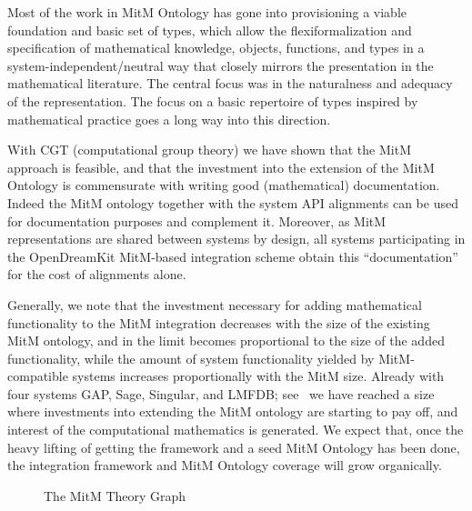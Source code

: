 \documentclass{deliverablereport}
\begin{document}
Most of the work in MitM Ontology has gone into provisioning a viable foundation
and basic set of types, which allow the flexiformalization and specification of
mathematical knowledge, objects, functions, and types in a system-independent/neutral way
that closely mirrors the presentation in the mathematical literature. The central focus
was in the naturalness and adequacy of the representation. The focus on a basic repertoire
of types inspired by mathematical practice goes a long way into this direction.

With CGT (computational group theory) we have shown that the MitM approach is feasible,
and that the investment into the extension of the MitM Ontology is commensurate with
writing good (mathematical) documentation. Indeed the MitM ontology together with the
system API alignments can be used for documentation purposes and complement it. Moreover, as
MitM representations are shared between systems by design, all systems participating in
the OpenDreamKit MitM-based integration scheme obtain this ``documentation'' for the cost
of alignments alone. 

Generally, we note that the investment necessary for adding mathematical functionality to
the MitM integration decreases with the size of the existing MitM ontology, and in the
limit becomes proportional to the size of the added functionality, while the amount of
system functionality yielded by MitM-compatible systems increases proportionally with the
MitM size. Already with four systems GAP, Sage, Singular, and LMFDB; see~\cite{ODK-D6.5}
we have reached a size where investments into extending the MitM ontology are starting to
pay off, and interest of the computational mathematics is generated. We expect that, once
the heavy lifting of getting the framework and a seed MitM Ontology has been done,
the integration framework and MitM Ontology coverage will grow organically.

\begin{figure}\centering
  \caption{The MitM Theory Graph}\label{fig:MitM-graph}
\end{figure}
\printbibliography
\end{document}
